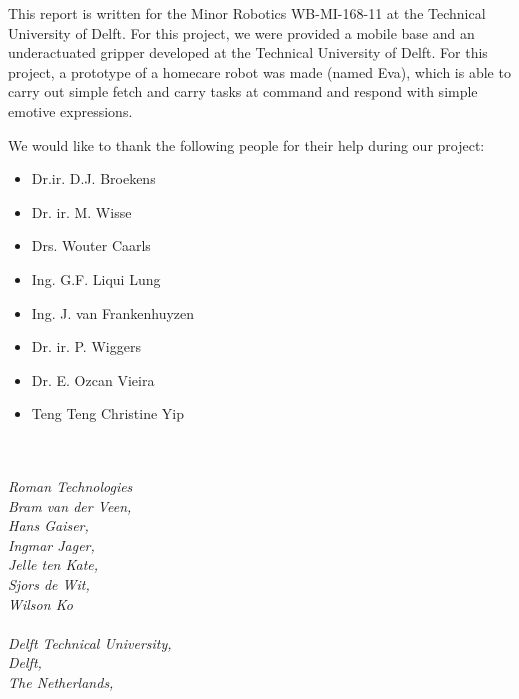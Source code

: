 \documentclass[project_eva.tex]{subfiles}
\begin{document}
This report is written for the Minor Robotics WB-MI-168-11 at the Technical University of Delft. For this project, we were provided a mobile base and an underactuated gripper developed at the Technical University of Delft. For this project, a prototype of a homecare robot was made (named Eva), which is able to carry out simple fetch and carry tasks at command and respond with simple emotive expressions.

We would like to thank the following people for their help during our project:
\\
\begin{itemize}
\item[] Dr.ir. D.J. Broekens 
\item[] Dr. ir. M. Wisse 
\item[] Drs. Wouter Caarls
\item[] Ing. G.F. Liqui Lung 
\item[] Ing. J. van Frankenhuyzen 
\item[] Dr. ir. P. Wiggers 
\item[] Dr. E. Ozcan Vieira
\item[] Teng Teng Christine Yip
\end{itemize}
 

\textit{
\\\\
Roman Technologies\\
Bram van der Veen,\\
Hans Gaiser,\\
Ingmar Jager,\\
Jelle ten Kate,\\  
Sjors de Wit,\\
Wilson Ko\\\\
Delft Technical University,\\
Delft,\\
The Netherlands,\\
}
\end{document}
